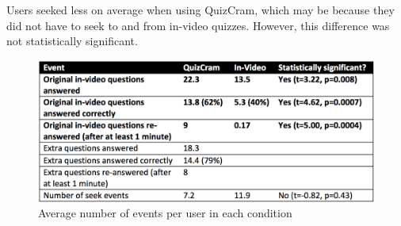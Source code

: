 \documentclass{sigchi}
\begin{document}

Users seeked less on average when using QuizCram, which may be because they did not have to seek to and from in-video quizzes. However, this difference was not statistically significant.

\begin{figure}
\centering
\includegraphics[width=1.0\columnwidth]{event-logs}
\caption{Average number of events per user in each condition}
\label{fig:event-logs}
\end{figure}



\end{document}
